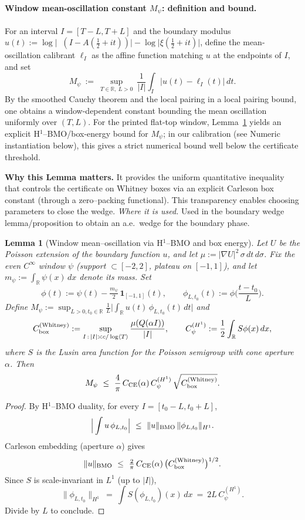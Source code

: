 \documentclass[11pt]{article}
\newtheorem{lemma}{Lemma}[section]
\theoremstyle{definition}
\theoremstyle{remark}
\newcommand{\R}{\mathbb{R}}
\DeclareMathOperator{\dettwo}{det_2}
\begin{document}
\vspace{1.0cm}
\paragraph{Window mean-oscillation constant \(M_\psi\): definition and bound.}
For an interval \(I=[T{-}L,T{+}L]\) and the boundary modulus \(u(t):=\log\big|\dettwo(I{-}A(\tfrac12{+}it))\big|{-}\log\big|\xi(\tfrac12{+}it)\big|\), define the mean-oscillation calibrant \(\ell_I\) as the affine function matching \(u\) at the endpoints of \(I\), and set
\[
  M_\psi\ :=\ \sup_{T\in\R,\ L>0}\ \frac{1}{|I|}\int_I \big|u(t)-\ell_I(t)\big|\,dt.
\]
By the smoothed Cauchy theorem and the local pairing in a local pairing bound, one obtains a window-dependent constant bounding the mean oscillation uniformly over $(T,L)$. For the printed flat-top window, Lemma~\ref{lem:Mpsi-correct} yields an explicit H$^1$--BMO/box-energy bound for $M_\psi$; in our calibration (see Numeric instantiation below), this gives a strict numerical bound well below the certificate threshold.




\vspace{1.0cm}
\noindent\textbf{Why this Lemma matters.} It provides the uniform quantitative inequality that controls the certificate on Whitney boxes via an explicit Carleson box constant (through a zero--packing functional). This transparency enables choosing parameters to close the wedge.
\noindent\textit{Where it is used.} Used in the boundary wedge lemma/proposition to obtain an a.e.\ wedge for the boundary phase.
\begin{lemma}[Window mean--oscillation via H$^1$--BMO and box energy]
\label{lem:Mpsi-correct}
Let $U$ be the Poisson extension of the boundary function $u$, and let $\mu := |\nabla U|^2\,\sigma\,dt\,d\sigma$.
Fix the even $C^\infty$ window $\psi$ (support $\subset[-2,2]$, plateau on $[-1,1]$), and let $m_\psi:=\int_{\R}\psi(x)\,dx$ denote its mass. Set
\[
\phi(t):=\psi(t)-\tfrac{m_\psi}{2}\,\mathbf 1_{[-1,1]}(t),\qquad 
\phi_{L,t_0}(t):=\phi\!\Big(\frac{t-t_0}{L}\Big).
\]
Define $M_\psi:=\sup_{L>0,t_0\in\R}\frac1L\big|\int_\R u(t)\,\phi_{L,t_0}(t)\,dt\big|$ and
\[
C_{\rm box}^{(\mathrm{Whitney})}:=\sup_{I\,:\,|I|\asymp c/\log\langle T\rangle}\frac{\mu(Q(\alpha I))}{|I|},\qquad
C_\psi^{(H^1)}:=\frac12\int_{\R} S\phi(x)\,dx,
\]
where $S$ is the Lusin area function for the Poisson semigroup with cone aperture $\alpha$.
Then
\[
M_\psi\ \le\ \frac{4}{\pi}\,C_{\mathrm{CE}}(\alpha)\,C_\psi^{(H^1)}\,\sqrt{C_{\rm box}^{(\mathrm{Whitney})}}.
\]
\end{lemma}
\begin{proof}
By H$^1$--BMO duality, for every $I=[t_0-L,t_0+L]$,
\[ \Big|\int u\,\phi_{L,t_0}\Big|\ \le\ \|u\|_{\rm BMO}\,\|\phi_{L,t_0}\|_{H^1}. \]
Carleson embedding (aperture $\alpha$) gives
\[ \|u\|_{\rm BMO}\ \le\ \tfrac{2}{\pi}\,C_{\mathrm{CE}}(\alpha)\,\big(C_{\rm box}^{(\mathrm{Whitney})}\big)^{1/2}. \]
Since $S$ is scale-invariant in $L^1$ (up to $|I|$),
\[ \|\phi_{L,t_0}\|_{H^1}\ =\ \int S(\phi_{L,t_0})(x)\,dx\ =\ 2L\,C_\psi^{(H^1)}. \]
Divide by $L$ to conclude.
\end{proof}
\end{document}
